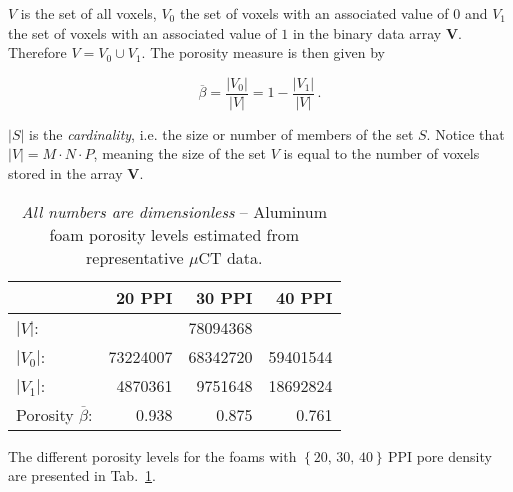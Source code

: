 \noindent $V$ is the set of all voxels, $V_0$ the set of voxels with an associated value of $0$ and $V_1$ the set of voxels with an associated value of $1$ in the binary data array ${\mathbf V}$. Therefore $V=V_0\cup V_1$. The porosity measure is then given by

\begin{equation}
   \overline{\beta} = \frac{\left|V_0\right|}{\left|V\right|}=1-\frac{\left|V_1\right|}{\left|V\right|}\,.
\end{equation}

\noindent $\left|S\right|$ is the \textit{cardinality}, i.e. the size or number of members of the set $S$. Notice that $\left|V\right|=M\cdot N\cdot P$, meaning the size of the set $V$ is equal to the number of voxels stored in the array ${\mathbf V}$.

\begin{table}[htbp]
   \centering
   \caption[Aluminum foam porosity levels.]{\textit{All numbers are dimensionless} -- Aluminum foam porosity levels estimated from representative $\mu\text{CT}$ data.}
   \begin{tabular}{l*{3}{r}}
      \toprule
       & 20 PPI & 30 PPI & 40 PPI \\
      \midrule
      $\left|V\right|$: & \multicolumn{3}{c}{78094368} \\
      $\left|V_0\right|$: & 73224007 &  68342720 & 59401544 \\
      $\left|V_1\right|$: & 4870361 & 9751648 & 18692824 \\
      \midrule
      Porosity $\overline{\beta}$: & 0.938 & 0.875 & 0.761 \\
      \bottomrule
   \end{tabular}
   \label{tab:FoamPorosities}
\end{table}

The different porosity levels for the foams with $\left\{20,\, 30,\,40\right\}\,\text{PPI}$ pore density are presented in Tab.~\ref{tab:FoamPorosities}.

\endinput